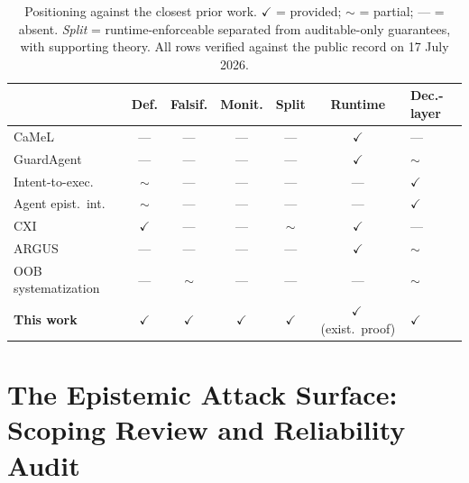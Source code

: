 \documentclass[conference]{IEEEtran}
\newcommand{\tick}{\ensuremath{\checkmark}}
\newcommand{\partl}{\ensuremath{\sim}}
\newcommand{\absent}{---}
\begin{document}
\begin{table}[t]
\centering
\caption{Positioning against the closest prior work.
$\tick$ = provided; $\partl$ = partial; --- = absent.
\emph{Split} = runtime-enforceable separated from auditable-only
guarantees, with supporting theory. All rows verified against the
public record on 17 July 2026.}
\label{tab:positioning}
\scriptsize
\setlength{\tabcolsep}{3pt}
\begin{tabularx}{\columnwidth}{@{}>{\raggedright\arraybackslash}X c c c c c >{\centering\arraybackslash}p{1.05cm}@{}}
\toprule
& Def. & Falsif. & Monit. & Split & Runtime & Dec.-layer \\
\midrule
CaMeL~\cite{camel} & \absent & \absent & \absent & \absent & \tick & \absent \\
GuardAgent~\cite{guardagent} & \absent & \absent & \absent & \absent & \tick & \partl \\
Intent-to-exec.~\cite{qu} & \partl & \absent & \absent & \absent & \absent & \tick \\
Agent epist.\ int.~\cite{shen} & \partl & \absent & \absent & \absent & \absent & \tick \\
CXI~\cite{cxi} & \tick & \absent & \absent & \partl & \tick & \absent \\
ARGUS~\cite{argus} & \absent & \absent & \absent & \absent & \tick & \partl \\
OOB systematization~\cite{oob} & \absent & \partl & \absent & \absent & \absent & \partl \\
\midrule
\textbf{This work} & \tick & \tick & \tick & \tick & \tick\,(exist.\ proof) & \tick \\
\bottomrule
\end{tabularx}
\end{table}

\section{The Epistemic Attack Surface: Scoping Review and
Reliability Audit}
\label{sec:review}
\end{document}
